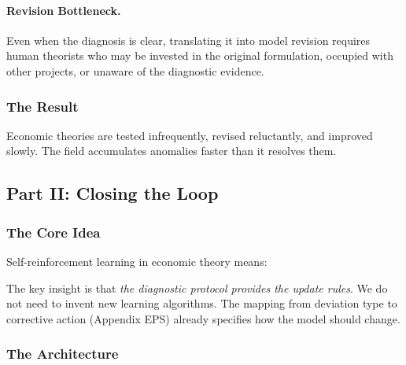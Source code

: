 \paragraph{Revision Bottleneck.}
Even when the diagnosis is clear, translating it into model revision requires 
human theorists who may be invested in the original formulation, occupied with 
other projects, or unaware of the diagnostic evidence.

\subsubsection{The Result}

Economic theories are tested infrequently, revised reluctantly, and improved 
slowly. The field accumulates anomalies faster than it resolves them.

\subsection{Part II: Closing the Loop}

\subsubsection{The Core Idea}

Self-reinforcement learning in economic theory means:

\begin{center}
\end{center}

The key insight is that \emph{the diagnostic protocol provides the update rules}. 
We do not need to invent new learning algorithms. The mapping from deviation 
type to corrective action (Appendix EPS) already specifies how the model should 
change.

\subsubsection{The Architecture}

